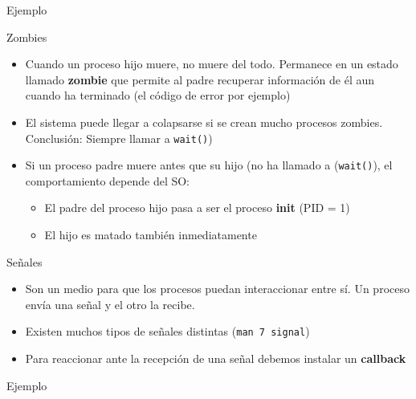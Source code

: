 \documentclass{mybeamer}
\begin{document}
\begin{framesubsec}{Ejemplo}
	\only<1| handout:1>{}
	\vspace{1em}
	\only<2| handout:2>{}
\end{framesubsec}

\begin{framesubsec}{Zombies}
	\begin{itemize}
		\item Cuando un proceso hijo muere, no muere del todo. Permanece
			en un estado llamado \textbf{zombie} que permite al
			padre recuperar información de él aun cuando ha
			terminado (el código de error por ejemplo)
		\item El sistema puede llegar a colapsarse si se crean mucho
			procesos zombies. Conclusión: Siempre llamar a
			\texttt{wait()})
		\item Si un proceso padre muere antes que su hijo (no ha llamado
			a (\texttt{wait()}), el comportamiento depende del SO:
		\begin{itemize}
			\item El padre del proceso hijo pasa a ser el proceso
				\textbf{init} (PID = 1)
			\item El hijo es matado también inmediatamente
		\end{itemize}
	\end{itemize}
\end{framesubsec}

\begin{framesec}{Señales}
	\begin{itemize}
		\item Son un medio para que los procesos puedan interaccionar
			entre sí. Un proceso envía una señal y el otro la
			recibe.
		\item Existen muchos tipos de señales distintas (\texttt{man 7
			signal})
		\item Para reaccionar ante la recepción de una señal debemos
			instalar un \textbf{callback}
	\end{itemize}
\end{framesec}

\begin{framesubsec}{Ejemplo}
	
\end{framesubsec}
\end{document}
